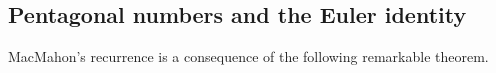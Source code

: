 

\setcounter{section}{3}
\setcounter{subsection}{8}
\setcounter{dfn}{19}

\subsection{Pentagonal numbers and the Euler identity}
MacMahon's recurrence is a consequence of the following remarkable theorem.

